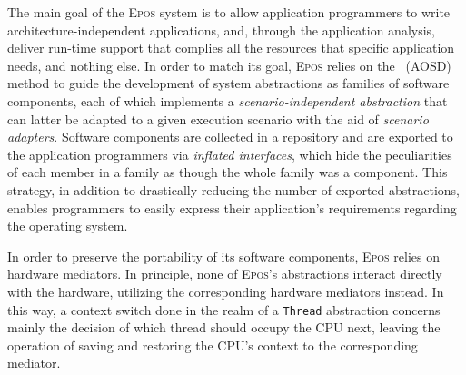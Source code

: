 The main goal of the \textsc{Epos} system is to allow application
programmers to write architecture-independent applications, and, through
the application analysis, deliver run-time support that complies all the
resources that specific application needs, and nothing else.  In order
to match its goal, \textsc{Epos} relies on the
\emph{\aosd{}}~(AOSD)~\cite{Froehlich:2001}
method to guide the development of system abstractions as families of
software components, each of which implements a
\emph{scenario-independent abstraction} that can latter be adapted to a
given execution scenario with the aid of \emph{scenario adapters}.
Software components are collected in a repository and are exported to
the application programmers via \emph{inflated interfaces}, which hide
the peculiarities of each member in a family as though the whole family
was a component. This strategy, in addition to drastically reducing the
number of exported abstractions, enables programmers to easily express
their application's requirements regarding the operating system.

In order to preserve the portability of its software components,
\textsc{Epos} relies on hardware mediators. In principle, none of
\textsc{Epos}'s abstractions interact directly with the hardware,
utilizing the corresponding hardware mediators instead. In this way, a
context switch done in the realm of a \texttt{Thread} abstraction
concerns mainly the decision of which thread should occupy the
\textsc{CPU} next, leaving the operation of saving and restoring the
\textsc{CPU}'s context to the corresponding mediator. 




